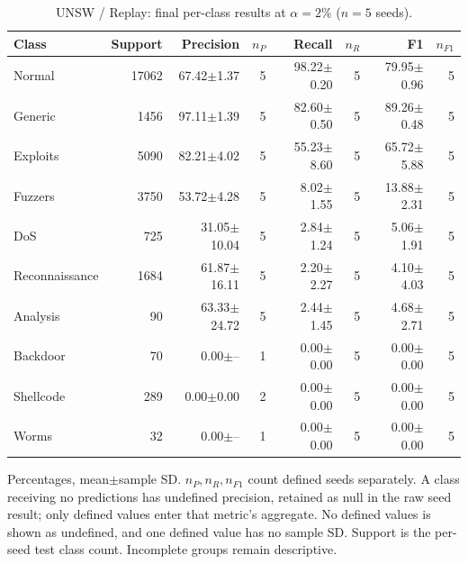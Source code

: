 \begin{table}[t]
\centering\scriptsize
\setlength{\tabcolsep}{3.3pt}
\caption{UNSW / Replay: final per-class results at $\alpha=2\%$ ($n=5$ seeds).}\label{tab:forgetting-class-unsw_nb15-replay}
\begin{tabular}{lrrrrrrr}
\toprule
Class & Support & Precision & $n_P$ & Recall & $n_R$ & F1 & $n_{F1}$ \\
\midrule
Normal & 17062 & 67.42$\pm$1.37 & 5 & 98.22$\pm$0.20 & 5 & 79.95$\pm$0.96 & 5 \\
Generic & 1456 & 97.11$\pm$1.39 & 5 & 82.60$\pm$0.50 & 5 & 89.26$\pm$0.48 & 5 \\
Exploits & 5090 & 82.21$\pm$4.02 & 5 & 55.23$\pm$8.60 & 5 & 65.72$\pm$5.88 & 5 \\
Fuzzers & 3750 & 53.72$\pm$4.28 & 5 & 8.02$\pm$1.55 & 5 & 13.88$\pm$2.31 & 5 \\
DoS & 725 & 31.05$\pm$10.04 & 5 & 2.84$\pm$1.24 & 5 & 5.06$\pm$1.91 & 5 \\
Reconnaissance & 1684 & 61.87$\pm$16.11 & 5 & 2.20$\pm$2.27 & 5 & 4.10$\pm$4.03 & 5 \\
Analysis & 90 & 63.33$\pm$24.72 & 5 & 2.44$\pm$1.45 & 5 & 4.68$\pm$2.71 & 5 \\
Backdoor & 70 & 0.00$\pm$-- & 1 & 0.00$\pm$0.00 & 5 & 0.00$\pm$0.00 & 5 \\
Shellcode & 289 & 0.00$\pm$0.00 & 2 & 0.00$\pm$0.00 & 5 & 0.00$\pm$0.00 & 5 \\
Worms & 32 & 0.00$\pm$-- & 1 & 0.00$\pm$0.00 & 5 & 0.00$\pm$0.00 & 5 \\
\bottomrule
\end{tabular}
\par\smallskip\begin{minipage}{0.98\textwidth}\scriptsize Percentages, mean$\pm$sample SD. $n_P,n_R,n_{F1}$ count defined seeds separately. A class receiving no predictions has undefined precision, retained as null in the raw seed result; only defined values enter that metric's aggregate. No defined values is shown as undefined, and one defined value has no sample SD. Support is the per-seed test class count. Incomplete groups remain descriptive.\end{minipage}
\end{table}


